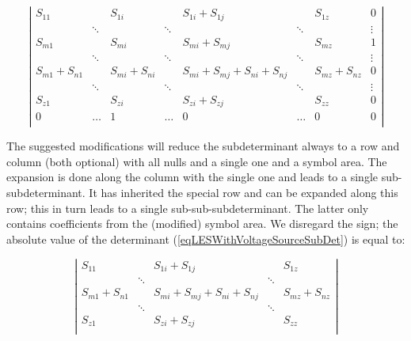 \begin{equation}
\label{eqLESWithVoltageSourceSubDet}
\left|
\begin{array}{cccccccc}
S_{11}        &        & S_{1i}        &        & S_{1i}+S_{1j}  &        & S_{1z}        & 0      \\
              & \ddots &               & \ddots &                & \ddots &               & \vdots \\
S_{m1}        &        & S_{mi}        &        & S_{mi}+S_{mj}  &        & S_{mz}        & 1      \\
              & \ddots &               & \ddots &                & \ddots &               & \vdots \\
S_{m1}+S_{n1} &        & S_{mi}+S_{ni} &        & S_{mi}+S_{mj}
                                                  +S_{ni}+S_{nj} &        & S_{mz}+S_{nz} & 0      \\
              & \ddots &               & \ddots &                & \ddots &               & \vdots \\
S_{z1}        &        & S_{zi}        &        & S_{zi}+S_{zj}  &        & S_{zz}        & 0      \\
0             & \ldots & 1             & \ldots & 0              & \ldots & 0             & 0      \\
\end{array}
\right|
\end{equation}

The suggested modifications will reduce the subdeterminant always to a row
and column (both optional) with all nulls and a single one and a symbol area.
The expansion is done along the column with the single one and leads to a
single sub-subdeterminant. It has inherited the special row and can be
expanded along this row; this in turn leads to a single
sub-sub-subdeterminant. The latter only contains coefficients from the
(modified) symbol area. We disregard the sign; the absolute value of the
determinant (\ref{eqLESWithVoltageSourceSubDet}) is equal to:

\begin{equation}
\label{eqLESWithVoltageSourceSubDetExpanded}
\left|
\begin{array}{ccccc}
S_{11}        &        & S_{1i}+S_{1j}  &        & S_{1z}        \\
              & \ddots &                & \ddots &               \\
S_{m1}+S_{n1} &        & S_{mi}+S_{mj}
                         +S_{ni}+S_{nj} &        & S_{mz}+S_{nz} \\
              & \ddots &                & \ddots &               \\
S_{z1}        &        & S_{zi}+S_{zj}  &        & S_{zz}        \\
\end{array}
\right|
\end{equation}


